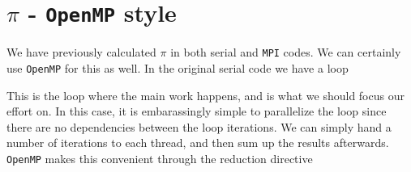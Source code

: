 \documentclass[twoside, 11pt, a4paper]{article}
\begin{document}


\section{$\pi$ - \texttt{OpenMP} style}
We have previously calculated $\pi$ in both serial and \texttt{MPI} codes. We can certainly use \texttt{OpenMP}
for this as well. In the original serial code we have a loop

This is the loop where the main work happens, and is what we should focus our effort on.
In this case, it is embarassingly simple to parallelize the loop since there are no dependencies between
the loop iterations. We can simply hand a number of iterations to each thread, and then sum up the
results afterwards. \texttt{OpenMP} makes this convenient through the reduction directive

\end{document}

